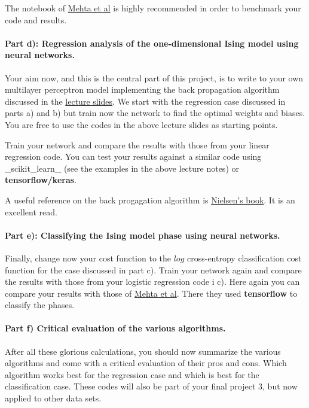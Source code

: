 \documentclass[%
oneside,                 %
final,                   %
10pt]{article}
\begin{document}
The notebook of \href{{https://physics.bu.edu/~pankajm/ML-Notebooks/HTML/NB_CVII-logreg_ising.html}}{Mehta et al} is highly recommended in order to benchmark your code and results.

\paragraph{Part d): Regression analysis of the one-dimensional Ising model using neural networks.}
Your aim now, and this is the central part of this project, is to
write to your own multilayer perceptron model implementing the back
propagation algorithm discussed in the \href{{https://compphysics.github.io/MachineLearning/doc/pub/NeuralNet/html/NeuralNet-bs.html}}{lecture
slides}. We
start with the regression case discussed in parts a) and b) but train
now the network to find the optimal weights and biases. You are free
to use the codes in the above lecture slides as starting points.

Train your network and compare the results with those from your linear regression code. 
You can test your results against a similar code using _scikit_learn_ (see the examples in the above lecture notes) or \textbf{tensorflow/keras}. 


A useful reference on the back progagation algorithm is \href{{http://neuralnetworksanddeeplearning.com/}}{Nielsen's book}. It is an excellent read.

\paragraph{Part e): Classifying the Ising model phase using neural networks.}
Finally, change now your cost function to the $log$ cross-entropy classification cost function for the case discussed in part c). Train your network again and
compare the results with those from your logistic  regression code i c). 
Here again you can compare your results with those of \href{{https://physics.bu.edu/~pankajm/ML-Notebooks/HTML/NB_CIX-DNN_ising_TFlow.html}}{Mehta et al}. There they used \textbf{tensorflow} to classify the phases. 



\paragraph{Part f) Critical evaluation of the various algorithms.}
After all these glorious calculations, you should now summarize the various algorithms and come with a critical evaluation of their pros and cons. Which algorithm works best for the regression case and which is best for the classification case. These codes will also be part of your final project 3, but now applied to other data sets.
\end{document}

